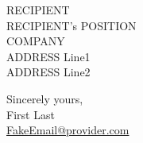 \documentclass[11pt]{letter}
\newcommand{\emaillink}[1]{\href{mailto:#1}{#1}}
\begin{document}
\begin{letter}{RECIPIENT \\
    RECIPIENT's POSITION \\
        COMPANY \\
        ADDRESS Line1 \\
        ADDRESS Line2}


    \closing{Sincerely yours, \\
        First Last \\
        \emaillink{FakeEmail@provider.com}}




\end{letter}
\end{document}
